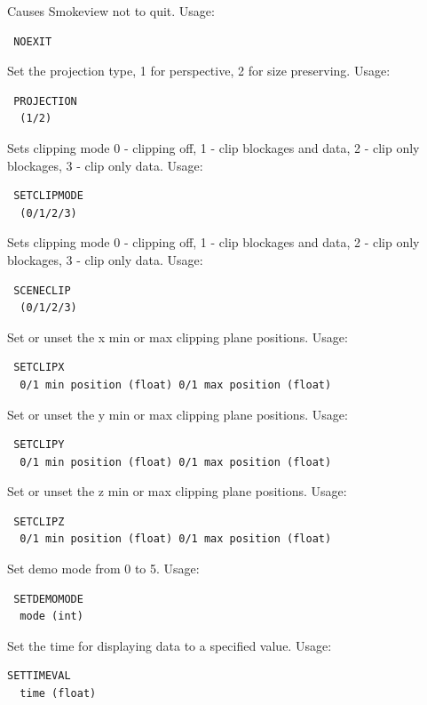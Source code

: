 \documentclass[11pt,twoside]{book}
\begin{document}
Causes Smokeview not to quit.
Usage:
\begin{lstlisting}
 NOEXIT
\end{lstlisting}

Set the projection type, 1 for perspective, 2 for size preserving.
Usage:
\begin{lstlisting}
 PROJECTION
  (1/2)
\end{lstlisting}

Sets clipping mode 0 - clipping off, 1 - clip blockages and data,
2 - clip only blockages, 3 - clip only data.
Usage:
\begin{lstlisting}
 SETCLIPMODE
  (0/1/2/3)
\end{lstlisting}

Sets clipping mode 0 - clipping off, 1 - clip blockages and data,
2 - clip only blockages, 3 - clip only data.
Usage:
\begin{lstlisting}
 SCENECLIP
  (0/1/2/3)
\end{lstlisting}


Set or unset the x  min or max clipping plane positions.
Usage:
\begin{lstlisting}
 SETCLIPX
  0/1 min position (float) 0/1 max position (float)
\end{lstlisting}

Set or unset the y  min or max clipping plane positions.
Usage:
\begin{lstlisting}
 SETCLIPY
  0/1 min position (float) 0/1 max position (float)
\end{lstlisting}

Set or unset the z  min or max clipping plane positions.
Usage:
\begin{lstlisting}
 SETCLIPZ
  0/1 min position (float) 0/1 max position (float)
\end{lstlisting}

Set demo mode from 0 to 5.
Usage:
\begin{lstlisting}
 SETDEMOMODE
  mode (int)
\end{lstlisting}

Set the time for displaying data to a specified value.
Usage:
\begin{lstlisting}
SETTIMEVAL
  time (float)
\end{lstlisting}
\end{document}
